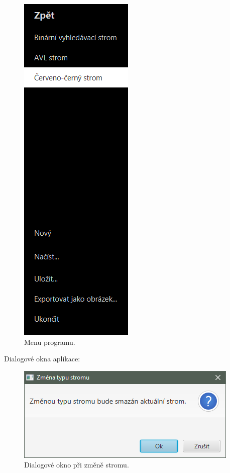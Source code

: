 \documentclass[
  biblatex=false,
  font=serif,
  glossaries=false,
  tables=false,
  theorems=false,
  index
]{kidiplom}
\begin{document}
\begin{figure}[h!]
\centering
	\includegraphics[scale=1]{obrazky/35Menu.png}
	\caption{Menu programu.}
	\label{menu}
\end{figure}

\newpage \noindent Dialogové okna aplikace:
\begin{figure}[h!]
\centering
	\includegraphics[scale=0.8]{obrazky/37Dialog2.png}
	\caption{Dialogové okno při změně stromu.}
	\label{dialogMenu}
\end{figure}
\end{document}
